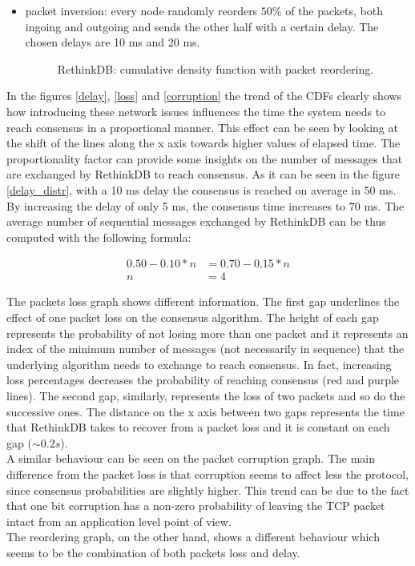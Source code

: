 \begin{itemize}
    \item packet inversion: every node randomly reorders \(50\%\) of the packets, both ingoing and outgoing and sends the other half with a certain delay. The chosen delays are 10 ms and 20 ms.

    \begin{figure}[H]
      \caption{RethinkDB: cumulative density function with packet reordering.}
    \end{figure}
\end{itemize}

In the figures \ref{delay}, \ref{loss} and \ref{corruption} the trend of the CDFs clearly shows how introducing these network issues influences the time the system needs to reach consensus in a proportional manner. This effect can be seen by looking at the shift of the lines along the x axis towards higher values of elapsed time. The proportionality factor can provide some insights on the number of messages that are exchanged by RethinkDB to reach consensus. As it can be seen in the figure \ref{delay_distr}, with a 10 ms delay the consensus is reached on average in 50 ms. By increasing the delay of only 5 ms, the consensus time increases to 70 ms. The average number of sequential messages exchanged by RethinkDB can be thus computed with the following formula:

\begin{align*}
  0.50 - 0.10*n &= 0.70 - 0.15*n \\
  n &= 4
\end{align*}

The packets loss graph shows different information. The first gap underlines the effect of one packet loss on the consensus algorithm. The height of each gap represents the probability of not losing more than one packet and it represents an index of the minimum number of messages (not necessarily in sequence) that the underlying algorithm needs to exchange to reach consensus. In fact, increasing loss percentages decreases the probability of reaching consensus (red and purple lines). The second gap, similarly, represents the loss of two packets and so do the successive ones. The distance on the x axis between two gaps represents the time that RethinkDB takes to recover from a packet loss and it is constant on each gap (\(\sim0.2s\)).\\
A similar behaviour can be seen on the packet corruption graph. The main difference from the packet loss is that corruption seems to affect less the protocol, since consensus probabilities are slightly higher. This trend can be due to the fact that one bit corruption has a non-zero probability of leaving the TCP packet intact from an application level point of view.\\
The reordering graph, on the other hand, shows a different behaviour which seems to be the combination of both packets loss and delay.

